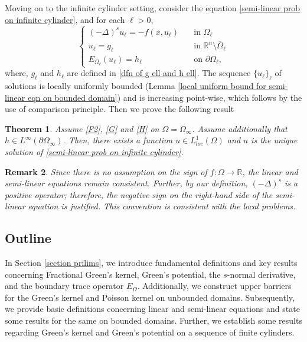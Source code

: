 \documentclass{amsart}
\newtheorem{theorem}{Theorem}[section]
\newtheorem{remark}[theorem]{Remark}
\newcommand{\R}{\mathbb{R}}
\newcommand{\slap}{(-\Delta)^{s}}
\newcommand{\ul}{u_{\ell}}
\begin{document}
Moving on to the infinite cylinder setting, consider the equation \eqref{semi-linear prob on infinite cylinder}, and for each $\ell>0$,
 \begin{equation}\label{semi-linear prob on finite cylinder}
    \begin{cases}
         \slap \ul=-f(x,\ul)\quad &\text{in } \Omega_{\ell}\\
         \ul=g_{\ell} &\text{in }\R^{n}\setminus\overline{\Omega}_{\ell}\\
         E_{\Omega_{\ell}}(\ul)=h_{\ell} &\text{on }\partial\Omega_{\ell},
    \end{cases}
 \end{equation}
 where, $g_{\ell}$ and $h_{\ell}$ are defined in \eqref{dfn of g ell and h ell}.
The sequence $\{u_{\ell}\}_{\ell}$ of solutions is locally uniformly bounded (Lemma \ref{local uniform bound for semi-linear eqn on bounded domain}) and is increasing point-wise, which follows by the use of comparison principle.
 Then we prove the following result
 \begin{theorem}\label{semilinear theorem}
     Assume \ref{F2}, \ref{G} and \ref{H} on $\Omega=\Omega_{\infty}$. Assume additionally that $h\in L^{\infty}(\partial\Omega_{\infty})$. Then, there exists a function $u\in L_{loc}^{1}(\Omega)$ and $u$ is the unique solution of \eqref{semi-linear prob on infinite cylinder}.
 \end{theorem}

 \begin{remark}
     Since there is no assumption on the sign of $f:\Omega\to \R$, the linear and semi-linear equations remain consistent. Further, by our definition, $\slap$ is a positive operator; therefore, the negative sign on the right-hand side of the semi-linear equation is justified. This convention is consistent with the local problems.
 \end{remark}
 \subsection{Outline}
In Section \ref{section prilims}, we introduce fundamental definitions and key results concerning Fractional Green's kernel, Green's potential, the $s$-normal derivative, and the boundary trace operator $E_{\Omega}$. Additionally, we construct upper barriers for the Green's kernel and Poisson kernel on unbounded domains. Subsequently, we provide basic definitions concerning linear and semi-linear equations and state some results for the same on bounded domains. Further, we establish some results regarding Green's kernel and Green's potential on a sequence of finite cylinders.
\end{document}
